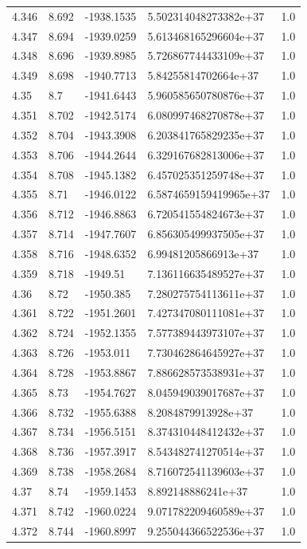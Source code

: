 \begin{tabular}{lllll}
4.346 & 8.692 & -1938.1535 & 5.502314048273382e+37 & 1.0 \\
4.347 & 8.694 & -1939.0259 & 5.613468165296604e+37 & 1.0 \\
4.348 & 8.696 & -1939.8985 & 5.726867744433109e+37 & 1.0 \\
4.349 & 8.698 & -1940.7713 & 5.84255814702664e+37 & 1.0 \\
4.35 & 8.7 & -1941.6443 & 5.960585650780876e+37 & 1.0 \\
4.351 & 8.702 & -1942.5174 & 6.080997468270878e+37 & 1.0 \\
4.352 & 8.704 & -1943.3908 & 6.203841765829235e+37 & 1.0 \\
4.353 & 8.706 & -1944.2644 & 6.329167682813006e+37 & 1.0 \\
4.354 & 8.708 & -1945.1382 & 6.457025351259748e+37 & 1.0 \\
4.355 & 8.71 & -1946.0122 & 6.5874659159419965e+37 & 1.0 \\
4.356 & 8.712 & -1946.8863 & 6.720541554824673e+37 & 1.0 \\
4.357 & 8.714 & -1947.7607 & 6.856305499937505e+37 & 1.0 \\
4.358 & 8.716 & -1948.6352 & 6.99481205866913e+37 & 1.0 \\
4.359 & 8.718 & -1949.51 & 7.136116635489527e+37 & 1.0 \\
4.36 & 8.72 & -1950.385 & 7.280275754113611e+37 & 1.0 \\
4.361 & 8.722 & -1951.2601 & 7.427347080111081e+37 & 1.0 \\
4.362 & 8.724 & -1952.1355 & 7.577389443973107e+37 & 1.0 \\
4.363 & 8.726 & -1953.011 & 7.730462864645927e+37 & 1.0 \\
4.364 & 8.728 & -1953.8867 & 7.886628573538931e+37 & 1.0 \\
4.365 & 8.73 & -1954.7627 & 8.045949039017687e+37 & 1.0 \\
4.366 & 8.732 & -1955.6388 & 8.2084879913928e+37 & 1.0 \\
4.367 & 8.734 & -1956.5151 & 8.374310448412432e+37 & 1.0 \\
4.368 & 8.736 & -1957.3917 & 8.543482741270514e+37 & 1.0 \\
4.369 & 8.738 & -1958.2684 & 8.716072541139603e+37 & 1.0 \\
4.37 & 8.74 & -1959.1453 & 8.892148886241e+37 & 1.0 \\
4.371 & 8.742 & -1960.0224 & 9.071782209460589e+37 & 1.0 \\
4.372 & 8.744 & -1960.8997 & 9.255044366522536e+37 & 1.0 \\

\end{tabular}
